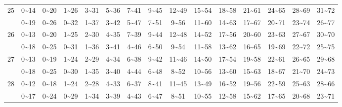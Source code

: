 \documentclass[lang=cn,10pt]{elegantbook}
\begin{document}
\begin{longtable}{c|cccccccccccccc}
    25 & 0\textasciitilde14 & 0\textasciitilde20 & 1\textasciitilde26 & 3\textasciitilde31 & 5\textasciitilde36 & 7\textasciitilde41 & 9\textasciitilde45 & 12\textasciitilde49 & 15\textasciitilde54 & 18\textasciitilde58 & 21\textasciitilde61 & 24\textasciitilde65 & 28\textasciitilde69 & 31\textasciitilde72 \\
       & 0\textasciitilde19 & 0\textasciitilde26 & 0\textasciitilde32 & 1\textasciitilde37 & 3\textasciitilde42 & 5\textasciitilde47 & 7\textasciitilde51 & 9\textasciitilde56 & 11\textasciitilde60 & 14\textasciitilde63 & 17\textasciitilde67 & 20\textasciitilde71 & 23\textasciitilde74 & 26\textasciitilde77 \\
    26 & 0\textasciitilde13 & 0\textasciitilde20 & 1\textasciitilde25 & 2\textasciitilde30 & 4\textasciitilde35 & 7\textasciitilde39 & 9\textasciitilde44 & 12\textasciitilde48 & 14\textasciitilde52 & 17\textasciitilde56 & 20\textasciitilde60 & 23\textasciitilde63 & 27\textasciitilde67 & 30\textasciitilde70 \\
       & 0\textasciitilde18 & 0\textasciitilde25 & 0\textasciitilde31 & 1\textasciitilde36 & 3\textasciitilde41 & 4\textasciitilde46 & 6\textasciitilde50 & 9\textasciitilde54 & 11\textasciitilde58 & 13\textasciitilde62 & 16\textasciitilde65 & 19\textasciitilde69 & 22\textasciitilde72 & 25\textasciitilde75 \\
    27 & 0\textasciitilde13 & 0\textasciitilde19 & 1\textasciitilde24 & 2\textasciitilde29 & 4\textasciitilde34 & 6\textasciitilde38 & 9\textasciitilde42 & 11\textasciitilde46 & 14\textasciitilde50 & 17\textasciitilde54 & 19\textasciitilde58 & 22\textasciitilde61 & 26\textasciitilde65 & 29\textasciitilde68 \\
       & 0\textasciitilde18 & 0\textasciitilde25 & 0\textasciitilde30 & 1\textasciitilde35 & 3\textasciitilde40 & 4\textasciitilde44 & 6\textasciitilde48 & 8\textasciitilde52 & 10\textasciitilde56 & 13\textasciitilde60 & 15\textasciitilde63 & 18\textasciitilde67 & 21\textasciitilde70 & 24\textasciitilde73 \\
    28 & 0\textasciitilde12 & 0\textasciitilde18 & 1\textasciitilde24 & 2\textasciitilde28 & 4\textasciitilde33 & 6\textasciitilde37 & 8\textasciitilde41 & 11\textasciitilde45 & 13\textasciitilde49 & 16\textasciitilde52 & 19\textasciitilde56 & 22\textasciitilde59 & 25\textasciitilde63 & 28\textasciitilde66 \\
       & 0\textasciitilde17 & 0\textasciitilde24 & 0\textasciitilde29 & 1\textasciitilde34 & 3\textasciitilde39 & 4\textasciitilde43 & 6\textasciitilde47 & 8\textasciitilde51 & 10\textasciitilde55 & 12\textasciitilde58 & 15\textasciitilde62 & 17\textasciitilde65 & 20\textasciitilde68 & 23\textasciitilde71 \\

\end{longtable}
\end{document}
